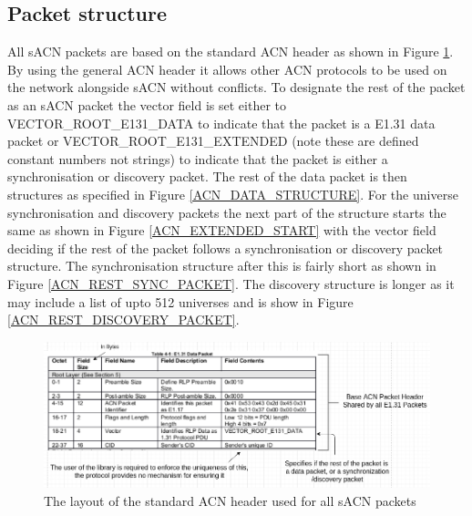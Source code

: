 \documentclass[11pt,a4paper]{article}
\begin{document}
\subsection{Packet structure}
All sACN packets are based on the standard ACN header as shown in Figure \ref{ACN_HEADER}. By using the general ACN header it allows other ACN protocols to be used on the network alongside sACN without conflicts. To designate the rest of the packet as an sACN packet the vector field is set either to VECTOR\_ROOT\_E131\_DATA to indicate that the packet is a E1.31 data packet or VECTOR\_ROOT\_E131\_EXTENDED (note these are defined constant numbers not strings) to indicate that the packet is either a synchronisation or discovery packet. The rest of the data packet is then structures as specified in Figure \ref{ACN_DATA_STRUCTURE}. For the universe synchronisation and discovery packets the next part of the structure starts the same as shown in Figure \ref{ACN_EXTENDED_START} with the vector field deciding if the rest of the packet follows a synchronisation or discovery packet structure. The synchronisation structure after this is fairly short as shown in Figure \ref{ACN_REST_SYNC_PACKET}. The discovery structure is longer as it may include a list of upto 512 universes and is show in Figure \ref{ACN_REST_DISCOVERY_PACKET}.

\begin{figure}[H]
\label{ACN_HEADER}
\includegraphics[width=\textwidth]{Acn_header}
\caption{The layout of the standard ACN header used for all sACN packets}
\end{figure}
\end{document}
